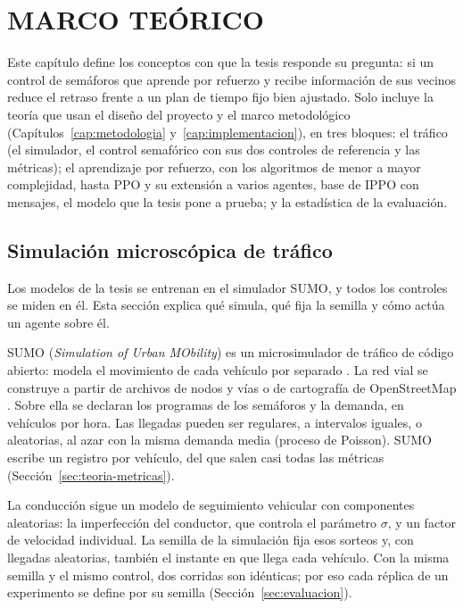 \renewcommand{\theequation}{\arabic{chapter}.\arabic{equation}}

\chapter{MARCO TEÓRICO}
\label{cap:teoria}

Este capítulo define los conceptos con que la tesis responde su pregunta: si un control de
semáforos que aprende por refuerzo y recibe información de sus vecinos reduce el retraso frente a
un plan de tiempo fijo bien ajustado. Solo incluye la teoría que usan el diseño del proyecto y el
marco metodológico (Capítulos~\ref{cap:metodologia} y~\ref{cap:implementacion}), en tres bloques: el tráfico (el simulador, el control semafórico
con sus dos controles de referencia y las métricas); el aprendizaje por refuerzo, con los
algoritmos de menor a mayor complejidad, hasta PPO y su extensión a varios agentes, base de IPPO
con mensajes, el modelo que la tesis pone a prueba; y la estadística de la evaluación.

\section{Simulación microscópica de tráfico}
\label{sec:teoria-simulacion}

Los modelos de la tesis se entrenan en el simulador SUMO, y todos los controles se miden en él.
Esta sección explica qué simula, qué fija la semilla y cómo actúa un agente sobre él.

SUMO (\textit{Simulation of Urban MObility}) es un microsimulador de tráfico de código abierto:
modela el movimiento de cada vehículo por separado \citep{TraCI_Whitepaper}. La red vial se
construye a partir de archivos de nodos y vías o de cartografía de OpenStreetMap
\citep{SUMO_Netconvert_OSM,OSM_About}. Sobre ella se declaran los programas de los semáforos y la
demanda, en vehículos por hora. Las llegadas pueden ser regulares, a intervalos iguales, o
aleatorias, al azar con la misma demanda media (proceso de Poisson). SUMO escribe un registro por
vehículo, del que salen casi todas las métricas (Sección~\ref{sec:teoria-metricas}).

La conducción sigue un modelo de seguimiento vehicular con componentes aleatorias: la imperfección
del conductor, que controla el parámetro $\sigma$, y un factor de velocidad individual. La semilla
de la simulación fija esos sorteos y, con llegadas aleatorias, también el instante en que llega
cada vehículo. Con la misma semilla y el mismo control, dos corridas son idénticas; por eso cada
réplica de un experimento se define por su semilla (Sección~\ref{sec:evaluacion}).

